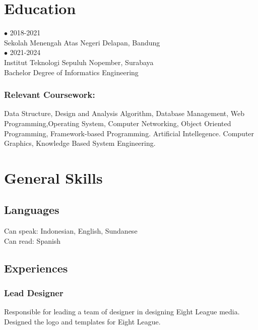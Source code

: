\documentclass{article}
\begin{document}
\section{Education}
{\Large $ \bullet $ 2018-2021} \\
{Sekolah Menengah Atas Negeri Delapan, Bandung}
\\[2em]
{\Large $ \bullet $ 2021-2024} \\
{Institut Teknologi Sepuluh Nopember, Surabaya}
\\
{Bachelor Degree of Informatics Engineering}
\subsubsection{Relevant Coursework:}
Data Structure, Design and Analysis Algorithm, Database Management, Web Programming,Operating System, Computer Networking, Object Oriented Programming, Framework-based Programming. Artificial Intellegence. Computer Graphics, Knowledge Based System Engineering.

\section{General Skills}

\subsection{Languages}
Can speak: Indonesian, English, Sundanese \\
Can read: Spanish 

\subsection{Experiences}
\subsubsection{Lead Designer}
Responsible for leading a team of designer in designing Eight League media. Designed the logo and templates for Eight League.

\end{document}

